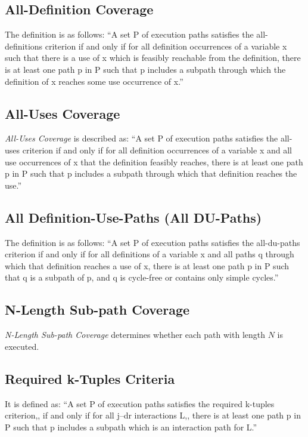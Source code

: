 \documentclass[12pt,a4paper]{report}
\begin{document}
\subsection{All-Definition Coverage}
The definition is as follows:
``A set P of execution paths satisfies the all-definitions criterion if and only if for all definition occurrences of a variable x such that there is a use of x which is feasibly reachable from the definition, there is at least one path p in P such that p includes a subpath through which the definition of x reaches some use occurrence of x.''\cite{Zhu:1997:SUT:267580.267590}

\subsection{All-Uses Coverage}
\emph{All-Uses Coverage} is described as:
``A set P of execution paths satisfies the all-uses criterion if and only if for all definition occurrences of a variable x and all use occurrences of x that the definition feasibly reaches, there is at least one path p in P such that p includes a subpath through which that definition reaches the use.''
\cite{Zhu:1997:SUT:267580.267590}

\subsection{All Definition-Use-Paths (All DU-Paths)}
The definition is as follows:
``A set P of execution paths satisfies the all-du-paths criterion if and only if for all definitions of a variable x and all paths q through which that definition reaches a use of x, there is at least one path p in P such that q is a subpath of p, and q is cycle-free or contains only simple cycles.''
\cite{Zhu:1997:SUT:267580.267590}

\subsection{N-Length Sub-path Coverage}
\emph{N-Length Sub-path Coverage} determines whether each path with length $N$ is executed.

\subsection{Required k-Tuples Criteria}
It is defined as:
``A set P of execution paths satisfies the required k-tuples criterion,, if and only if for all j–dr interactions L,, there is at least one path p in P such
 that p includes a subpath which is an interaction path for L.''\cite{Zhu:1997:SUT:267580.267590}
\end{document}
